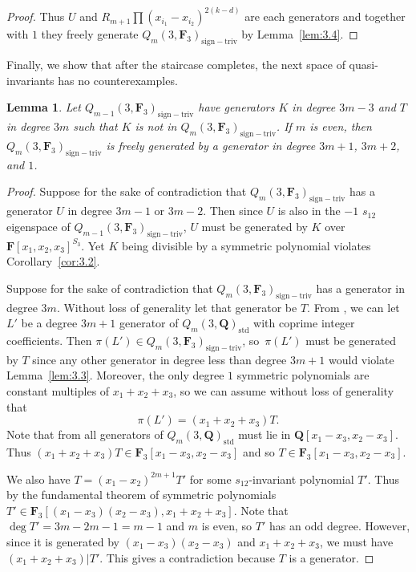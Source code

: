 \documentclass[11pt]{article}
\numberwithin{equation}{section}
\newtheorem{Lemma}[Theorem]{Lemma}
\theoremstyle{definition}
\numberwithin{equation}{section}
\newcommand{\std}{\mathrm{std}}
\newcommand{\siv}{\mathrm{sign-triv}}
\begin{document}
\begin{proof}
 Thus $U$ and $R_{m+1}\prod (x_{i_1}-x_{i_2})^{2(k-d)}$ are each generators and together with $1$ they freely generate $Q_m(3,\mathbf{F}_3)_{\siv}$ by Lemma~\ref{lem:3.4}.
\end{proof}

Finally, we show that after the staircase completes, the next space of quasi-invariants has no counterexamples.

\begin{Lemma}\label{backNon}
 Let $Q_{m-1}(3,\mathbf{F}_3)_{\siv}$ have generators $K$ in degree $3m-3$ and $T$ in degree $3m$ such that $K$ is not in $Q_{m}(3,\mathbf{F}_3)_{\siv}$. If $m$ is even, then $Q_{m}(3,\mathbf{F}_3)_{\siv}$ is freely generated by a generator in degree $3m+1$, $3m+2$, and $1$.
\end{Lemma}
\begin{proof}
 Suppose for the sake of contradiction that $Q_{m}(3,\mathbf{F}_3)_{\siv}$ has a generator $U$ in degree $3m-1$ or $3m-2$. Then since $U$ is also in the $-1$ $s_{12}$ eigenspace of $Q_{m-1}(3,\mathbf{F}_3)_{\siv}$, $U$ must be generated by $K$ over $\mathbf{F}[x_1,x_2,x_3]^{S_3}$. Yet $K$ being divisible by a symmetric polynomial violates Corollary~\ref{cor:3.2}.

 Suppose for the sake of contradiction that $Q_{m}(3,\mathbf{F}_3)_{\siv}$ has a generator in degree $3m$. Without loss of generality let that generator be $T$. From \cite{felder2001action}, we can let $L'$ be a degree $3m+1$ generator of $Q_m(3,\mathbf{Q})_{\std}$ with coprime integer coefficients. Then $\pi(L')\in Q_m(3,\mathbf{F}_3)_{\siv}$, so~$\pi(L')$ must be generated by $T$ since any other generator in degree less than degree $3m+1$ would violate Lemma~\ref{lem:3.3}. Moreover, the only degree $1$ symmetric polynomials are constant multiples of $x_1+x_2+x_3$, so we can assume without loss of generality that
 \[\pi(L')=(x_1+x_2+x_3)T.\]
 Note that from \cite{wang2022explicit} all generators of $Q_m(3,\mathbf{Q})_{\std}$ must lie in $\mathbf{Q}[x_1-x_3,x_2-x_3]$. Thus $(x_1+x_2+x_3)T\in\mathbf{F}_3[x_1-x_3,x_2-x_3]$ and so $T\in \mathbf{F}_3[x_1-x_3,x_2-x_3]$.

 We also have $T=(x_1-x_2)^{2m+1}T'$ for some $s_{12}$-invariant polynomial $T'$. Thus by the fundamental theorem of symmetric polynomials $T'\in \mathbf{F}_3[(x_1-x_3)(x_2-x_3),x_1+x_2+x_3]$. Note that $\deg T' = 3m-2m-1=m-1$ and $m$ is even, so $T'$ has an odd degree. However, since it is generated by $(x_1-x_3)(x_2-x_3)$ and $x_1+x_2+x_3$, we must have $(x_1+x_2+x_3)|T'$. This gives a contradiction because $T$ is a generator.
\end{proof}
\end{document}
